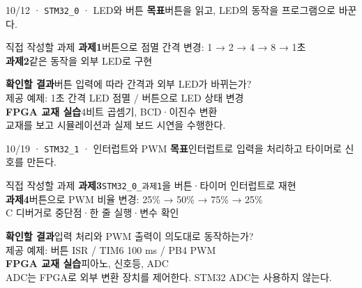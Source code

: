 \documentclass[aspectratio=43,11pt,t]{beamer}
\newcommand{\lab}[1]{\texttt{STM32\_#1}}
\newcommand{\task}[2]{\texttt{STM32\_#1\_과제#2}}
\begin{document}
\begin{frame}{10/12 · \lab{0} · LED와 버튼}
\fontsize{10}{13}\selectfont
\textbf{목표}\quad 버튼을 읽고, LED의 동작을 프로그램으로 바꾼다.
\vspace{0.2cm}
\begin{block}{직접 작성할 과제}
\fontsize{10}{13}\selectfont
\textbf{과제1}\quad 버튼으로 점멸 간격 변경: 1 → 2 → 4 → 8 → 1초\\[0.12cm]
\textbf{과제2}\quad 같은 동작을 외부 LED로 구현
\end{block}
\vspace{0.15cm}
\textbf{확인할 결과}\quad 버튼 입력에 따라 간격과 외부 LED가 바뀌는가?\\[0.2cm]
\fontsize{9}{12}\selectfont
제공 예제: 1초 간격 LED 점멸 / 버튼으로 LED 상태 변경\\[0.15cm]
\textbf{FPGA 교재 실습}\quad 4비트 곱셈기, BCD·이진수 변환\\[0.1cm]
교재를 보고 시뮬레이션과 실제 보드 시연을 수행한다.
\end{frame}

\begin{frame}{10/19 · \lab{1} · 인터럽트와 PWM}
\fontsize{10}{13}\selectfont
\textbf{목표}\quad 인터럽트로 입력을 처리하고 타이머로 신호를 만든다.
\vspace{0.2cm}
\begin{block}{직접 작성할 과제}
\fontsize{10}{13}\selectfont
\textbf{과제3}\quad \task{0}{1}을 버튼·타이머 인터럽트로 재현\\[0.12cm]
\textbf{과제4}\quad 버튼으로 PWM 비율 변경: 25\% → 50\% → 75\% → 25\%\\
\hspace*{1.15cm}C 디버거로 중단점·한 줄 실행·변수 확인
\end{block}
\vspace{0.15cm}
\textbf{확인할 결과}\quad 입력 처리와 PWM 출력이 의도대로 동작하는가?\\[0.2cm]
\fontsize{9}{12}\selectfont
제공 예제: 버튼 ISR / TIM6 100 ms / PB4 PWM\\[0.15cm]
\textbf{FPGA 교재 실습}\quad 피아노, 신호등, ADC\\[0.1cm]
ADC는 FPGA로 외부 변환 장치를 제어한다. STM32 ADC는 사용하지 않는다.
\end{frame}
\end{document}
